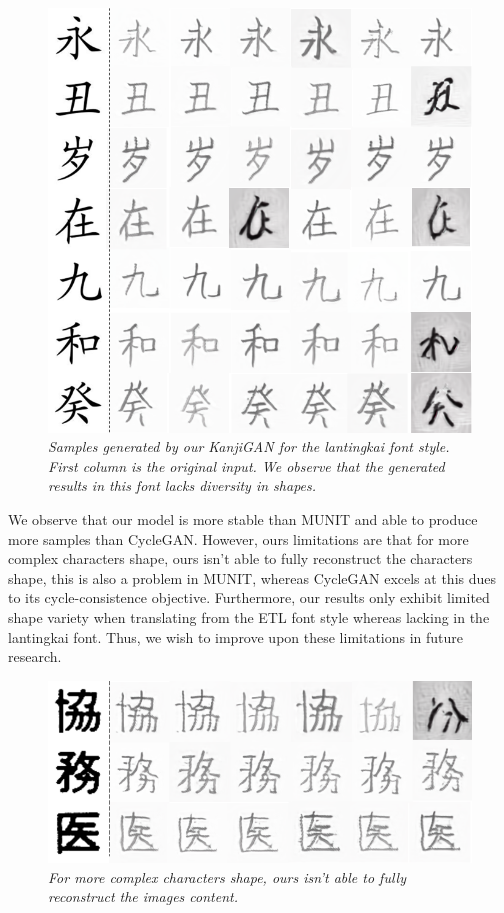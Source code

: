 \documentclass[12pt]{report}
\begin{document}
\begin{figure}[H]
	\centering
	\includegraphics[scale=0.9]{kanji-gan-results-3}
	\caption{\textit{Samples generated by our KanjiGAN for the lantingkai font style. First column is the original input. We observe that the generated results in this font lacks diversity in shapes.}}
	\label{fig:kanji-gan-results-3}
\end{figure}

We observe that our model is more stable than MUNIT and able to produce more samples than CycleGAN. However, ours limitations are that for more complex characters shape, ours isn't able to fully reconstruct the characters shape, this is also a problem in MUNIT, whereas CycleGAN excels at this dues to its cycle-consistence objective. Furthermore, our results only exhibit limited shape variety when translating from the ETL font style whereas lacking in the lantingkai font. Thus, we wish to improve upon these limitations in future research.

\begin{figure}[H]
	\centering
	\includegraphics[scale=0.8]{kanji-gan-results-4}
	\caption{\textit{For more complex characters shape, ours isn't able to fully reconstruct the images content.}}
	\label{fig:kanji-gan-results-4}
\end{figure}
\end{document}
